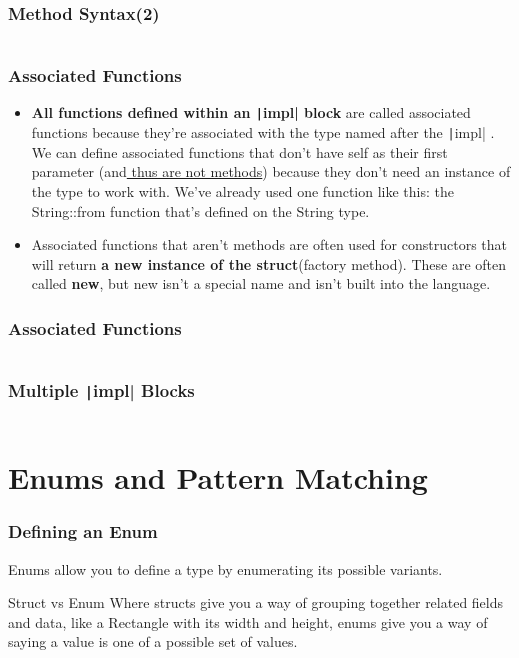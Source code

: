 \documentclass{beamer}
\begin{document}
\begin{frame}[fragile]
	\frametitle{Method Syntax(2)}
	\inputminted{rust}{./code/method.rs}
\end{frame}

\begin{frame}[fragile]
	\frametitle{Associated Functions}
	\begin{itemize}
		\item \textbf{All functions defined within an \texttt|impl|  block} are called associated functions because they’re associated with the type named after the  \texttt|impl| . We can define associated functions that don’t have self as their first parameter (and\underline{ thus are not methods}) because they don’t need an instance of the type to work with. We’ve already used one function like this: the String::from function that’s defined on the String type.
		\item 	Associated functions that aren’t methods are often used for constructors that will return \textbf{a new instance of the struct}(factory method). These are often called \textbf{new}, but new isn’t a special name and isn’t built into the language.
	\end{itemize}
\end{frame}

\begin{frame}[fragile]
	\frametitle{Associated Functions}
	\inputminted{rust}{./code/factory-method.rs}
\end{frame}

\begin{frame}[fragile]
	\frametitle{Multiple \texttt|impl| Blocks}
	\inputminted{rust}{./code/multi-impl.rs}
\end{frame}

\section{Enums and Pattern Matching}
\begin{frame}[fragile]
	\frametitle{Defining an Enum}
	Enums allow you to define a type by enumerating its possible variants.
	\begin{block}{Struct vs Enum}
		Where structs give you a way of grouping together related fields and data, like a Rectangle with its width and height, enums give you a way of saying a value is one of a possible set of values. 
	\end{block}
	\inputminted{rust}{./code/enum.rs}
\end{frame}
\end{document}
